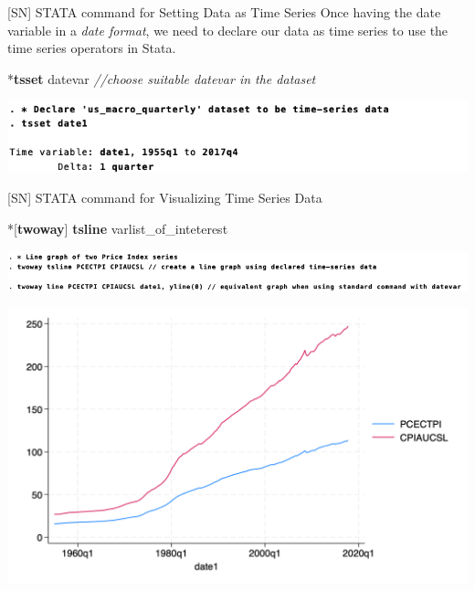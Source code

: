 \documentclass[
  10pt,
  ignorenonframetext,
]{beamer}
\newenvironment{Shaded}{\begin{snugshade}}{\end{snugshade}}
\newcommand{\CommentTok}[1]{\textcolor[rgb]{0.56,0.35,0.01}{\textit{#1}}}
\newcommand{\KeywordTok}[1]{\textcolor[rgb]{0.13,0.29,0.53}{\textbf{#1}}}
\newcommand{\NormalTok}[1]{#1}
\begin{document}
\begin{frame}[fragile]{{[}SN{]} STATA command for Setting Data as Time
Series}
\protect\hypertarget{sn-stata-command-for-setting-data-as-time-series}{}
Once having the date variable in a \emph{date format}, we need to
declare our data as time series to use the time series operators in
Stata.

\small

\begin{Shaded}
\begin{Highlighting}[]
\NormalTok{*}\KeywordTok{tsset}\NormalTok{ datevar}
\CommentTok{//choose suitable \textquotesingle{}datevar\textquotesingle{} in the dataset}
\end{Highlighting}
\end{Shaded}

\begin{flushleft}\includegraphics[width=0.9\linewidth]{pictures/S3-DeclareTimeSeries} \end{flushleft}
\end{frame}

\begin{frame}[fragile]{{[}SN{]} STATA command for Visualizing Time
Series Data}
\protect\hypertarget{sn-stata-command-for-visualizing-time-series-data}{}
\small

\begin{Shaded}
\begin{Highlighting}[]
\NormalTok{*[}\KeywordTok{twoway}\NormalTok{] }\KeywordTok{tsline}\NormalTok{ varlist\_of\_inteterest}
\end{Highlighting}
\end{Shaded}

\begin{flushleft}\includegraphics[width=0.9\linewidth]{pictures/S4-LineGraphExample-code} \end{flushleft}

\begin{center}\includegraphics[width=0.7\linewidth]{pictures/S4-LineGraphExample} \end{center}
\end{frame}
\end{document}
